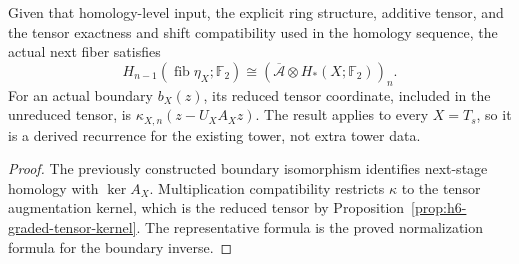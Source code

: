 \begin{proposition}
  \label{prop:h6-kunneth-tower-recurrence}
  \leanok
  Given that homology-level input, the explicit ring structure, additive
  tensor, and the tensor exactness and shift compatibility used in the
  homology sequence, the actual next fiber satisfies
  \[
    H_{n-1}(\operatorname{fib}\eta_X;\mathbb F_2)
      \cong(\overline{\mathcal A}\otimes H_*(X;\mathbb F_2))_n.
  \]
  For an actual boundary $b_X(z)$, its reduced tensor coordinate, included
  in the unreduced tensor, is $\kappa_{X,n}(z-U_XA_Xz)$.
  The result applies to every $X=T_s$, so it is a derived recurrence for
  the existing tower, not extra tower data.
\end{proposition}
\begin{proof}
  The previously constructed boundary isomorphism identifies next-stage
  homology with $\ker A_X$. Multiplication compatibility restricts
  $\kappa$ to the tensor augmentation kernel, which is the reduced tensor
  by Proposition~\ref{prop:h6-graded-tensor-kernel}. The representative
  formula is the proved normalization formula for the boundary inverse.
  \leanok
\end{proof}


